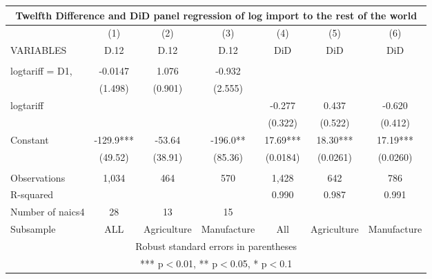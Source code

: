 \begin{tabular}{lcccccc}
\multicolumn{7}{c}{Twelfth Difference and DiD panel regression of log import to the rest of the world} \\ \hline
 & (1) & (2) & (3) & (4) & (5) & (6) \\
VARIABLES & D.12 & D.12 & D.12 & DiD & DiD & DiD \\ \hline
 &  &  &  &  &  &  \\
logtariff = D1, & -0.0147 & 1.076 & -0.932 &  &  &  \\
 & (1.498) & (0.901) & (2.555) &  &  &  \\
logtariff &  &  &  & -0.277 & 0.437 & -0.620 \\
 &  &  &  & (0.322) & (0.522) & (0.412) \\
Constant & -129.9*** & -53.64 & -196.0** & 17.69*** & 18.30*** & 17.19*** \\
 & (49.52) & (38.91) & (85.36) & (0.0184) & (0.0261) & (0.0260) \\
 &  &  &  &  &  &  \\
Observations & 1,034 & 464 & 570 & 1,428 & 642 & 786 \\
R-squared &  &  &  & 0.990 & 0.987 & 0.991 \\
Number of naics4 & 28 & 13 & 15 &  &  &  \\
 Subsample & ALL & Agriculture & Manufacture & All & Agriculture & Manufacture \\ \hline
\multicolumn{7}{c}{ Robust standard errors in parentheses} \\
\multicolumn{7}{c}{ *** p$<$0.01, ** p$<$0.05, * p$<$0.1} \\
\end{tabular}
